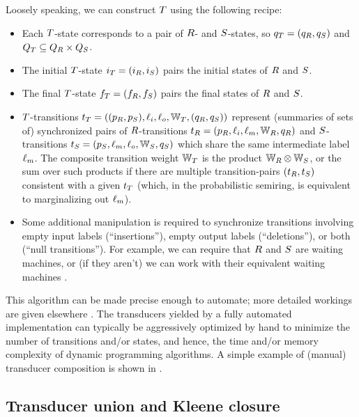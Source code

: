 \documentclass[english]{article}
\begin{document}
Loosely speaking, we can construct $T$ using the following recipe:
\begin{itemize}
\item Each $T$-state corresponds to a pair of $R$- and $S$-states,
so $q_{T} = (q_{R}, q_{S})$
and $Q_{T} \subseteq Q_{R} \times Q_{S}$.
\item The initial $T$-state $i_{T}=(i_{R},i_{S})$ pairs the initial states of $R$ and $S$.
\item The final $T$-state $f_{T}=(f_{R},f_{S})$ pairs the final states of $R$ and $S$.
\item $T$-transitions
$t_{T} = ((p_{R},p_{S}),\ell_i,\ell_o,\mathbb{W}_{T},(q_{R},q_{S}))$
represent (summaries of sets of) synchronized pairs of $R$-transitions
$t_{R} = (p_{R},\ell_i,\ell_m,\mathbb{W}_{R},q_{R})$
and $S$-transitions
$t_{S} = (p_{S},\ell_m,\ell_o,\mathbb{W}_{S},q_{S})$
which share the same intermediate label $\ell_m$.
The composite transition weight $\mathbb{W}_{T}$ is the product $\mathbb{W}_{R} \otimes \mathbb{W}_{S}$,
or the sum over such products if there are multiple transition-pairs $(t_{R},t_{S})$
consistent with a given $t_{T}$
(which, in the probabilistic semiring, is equivalent to marginalizing out $\ell_m$).
\item Some additional manipulation is required to synchronize
transitions involving empty input labels (``insertions''),
empty output labels (``deletions''),
or both (``null transitions'').
For example, we can require that $R$ and $S$ are waiting machines,
or (if they aren't) we can work with their equivalent waiting machines \cite{WestessonEtAlArxiv2012}.
\end{itemize}

This algorithm can be made precise enough to automate;
more detailed workings are given elsewhere \cite{PereiraRiley1996,MohriPereiraRiley2000,Holmes2003,Holmes2007,WestessonEtAlArxiv2012,WestessonEtAl2012}.
The transducers yielded by a fully automated implementation can typically be aggressively optimized by hand
to minimize the number of transitions and/or states,
and hence,
the time and/or memory complexity of dynamic programming algorithms.
A simple example of (manual) transducer composition is shown in .

\subsection{Transducer union and Kleene closure}
\end{document}
